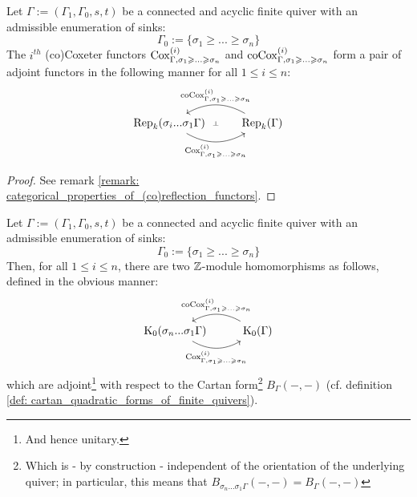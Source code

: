             \begin{lemma} \label{lemma: coxeter_functors_are_adjoints}
                Let $\Gamma := (\Gamma_1, \Gamma_0, s, t)$ be a connected and acyclic finite quiver with an admissible enumeration of sinks:
                    $$\Gamma_0 := \{\sigma_1 \geq ... \geq \sigma_n\}$$
                The $i^{th}$ (co)Coxeter functors $\mathrm{Cox}^{(i)}_{\Gamma, \sigma_1 \geqslant ...\geqslant \sigma_n}$ and $\mathrm{co}\mathrm{Cox}^{(i)}_{\Gamma, \sigma_1 \geqslant ...\geqslant \sigma_n}$ form a pair of adjoint functors in the following manner for all $1 \leq i \leq n$:
                    $$
                        \begin{tikzcd}
                        	{\Rep_k(\sigma_i ... \sigma_1\Gamma)} & {\Rep_k(\Gamma)}
                        	\arrow[""{name=0, anchor=center, inner sep=0}, "{\Cox^{(i)}_{\Gamma, \sigma_1 \geq ...\geq \sigma_n}}"', bend right, from=1-1, to=1-2]
                        	\arrow[""{name=1, anchor=center, inner sep=0}, "{\co\Cox^{(i)}_{\Gamma, \sigma_1 \geq ...\geq \sigma_n}}"', bend right, from=1-2, to=1-1]
                        	\arrow["\dashv"{anchor=center, rotate=-90}, draw=none, from=1, to=0]
                        \end{tikzcd}
                    $$
            \end{lemma}
                \begin{proof}
                    See remark \ref{remark: categorical_properties_of_(co)reflection_functors}.
                \end{proof}
            \begin{corollary} \label{coro: coxeter_functors_and_grothendieck_groups}
                Let $\Gamma := (\Gamma_1, \Gamma_0, s, t)$ be a connected and acyclic finite quiver with an admissible enumeration of sinks:
                    $$\Gamma_0 := \{\sigma_1 \geq ... \geq \sigma_n\}$$
                Then, for all $1 \leq i \leq n$, there are two $\mathbb{Z}$-module homomorphisms as follows, defined in the obvious manner:
                    $$
                        \begin{tikzcd}
                        	{\K_0(\sigma_n ... \sigma_1 \Gamma)} & {\K_0(\Gamma)}
                        	\arrow[""{name=0, anchor=center, inner sep=0}, "{\Cox_{\Gamma, \sigma_1 \geq ...\geq \sigma_n}^{(i)}}"', bend right, from=1-1, to=1-2]
                        	\arrow[""{name=1, anchor=center, inner sep=0}, "{\co\Cox_{\Gamma, \sigma_1 \geq ...\geq \sigma_n}^{(i)}}"', bend right, from=1-2, to=1-1]
                        \end{tikzcd}
                    $$
                which are adjoint\footnote{And hence unitary.} with respect to the Cartan form\footnote{Which is - by construction - independent of the orientation of the underlying quiver; in particular, this means that $B_{\sigma_n ... \sigma_1 \Gamma}(-, -) = B_{\Gamma}(-, -)$} $B_{\Gamma}(-, -)$ (cf. definition \ref{def: cartan_quadratic_forms_of_finite_quivers}).
            \end{corollary}
